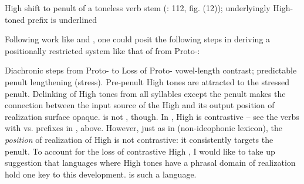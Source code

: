 \documentclass[output=paper
,newtxmath
,modfonts
,nonflat]{langsci/langscibook}
\begin{document}
\ea\label{ex:downing:11}  High  shift to penult of a toneless verb stem (\citealt{Kisseberth1984}: 112, fig. (12)); underlyingly High-toned  prefix is underlined
\ea\label{ex:downing:11a}
\ex\label{ex:downing:11b}
 \ex\label{ex:downing:11c}
 \ex\label{ex:downing:11d}
\ex\label{ex:downing:11e}
\z 
\z

Following work like \citet{Clemens&Goldsmith1984} and \citet{Philippson1998}, one could posit the following steps in deriving a positionally restricted  system like that of  from Proto-:

\begin{comment}
\ea 
 \gll \\
   \\
 \glt
\z
\end{comment}

\ea\label{ex:downing:12}  Diachronic steps from Proto- to 
\ea\label{ex:downing:12a} Loss of Proto- vowel-length contrast; predictable penult lengthening (stress).
\ex\label{ex:downing:12b} Pre-penult High tones are attracted to the stressed penult.
\ex\label{ex:downing:12c} Delinking of High tones from all syllables except the penult makes the connection between the input source of the High  and its output position of realization surface opaque.
\z
\z
{} is not , though. In , High  is contrastive – see the verbs with  vs.   prefixes in , above. However, just as in  (non-ideophonic lexicon), the \textit{position} of realization of High  is not contrastive: it consistently targets the penult. To account for the loss of contrastive High , I would like to take up  suggestion that languages where High tones have a phrasal domain of realization hold one key to this development.  is such a language.
\end{document}
